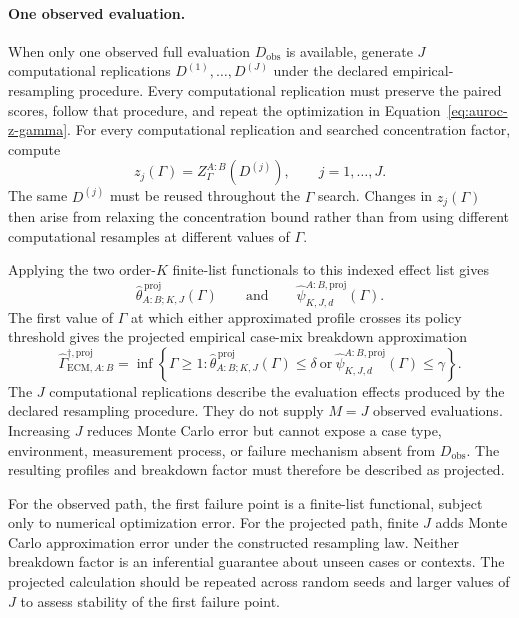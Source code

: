 \documentclass[11pt]{article}
\theoremstyle{remark}
\begin{document}
\paragraph{One observed evaluation.}
When only one observed full evaluation $D_{\mathrm{obs}}$ is available,
generate $J$ computational replications $D^{(1)},\ldots,D^{(J)}$ under the
declared empirical-resampling procedure. Every computational replication must preserve the paired scores,
follow that procedure, and repeat the optimization in
Equation~\eqref{eq:auroc-z-gamma}. For every computational replication and
searched concentration factor, compute
\[
z_j(\Gamma)
=
Z_\Gamma^{A:B}\!\left(D^{(j)}\right),
\qquad j=1,\ldots,J.
\]
The same $D^{(j)}$ must be reused throughout the $\Gamma$ search. Changes in
$z_j(\Gamma)$ then arise from relaxing the concentration bound rather than from
using different computational resamples at different values of $\Gamma$.

Applying the two order-$K$ finite-list functionals to this indexed effect list
gives
\[
\widehat\theta_{A:B;K,J}^{\,\mathrm{proj}}(\Gamma)
\qquad\text{and}\qquad
\widehat\psi_{K,J,d}^{A:B,\mathrm{proj}}(\Gamma).
\]
The first value of $\Gamma$ at which either approximated profile crosses its policy
threshold gives the projected empirical case-mix breakdown approximation
\begin{equation}
\widehat\Gamma_{\mathrm{ECM},A:B}^{\dagger,\mathrm{proj}}
=
\inf\left\{
\Gamma\geq1:
\widehat\theta_{A:B;K,J}^{\,\mathrm{proj}}(\Gamma)\leq\delta
\ \text{or}\ 
\widehat\psi_{K,J,d}^{A:B,\mathrm{proj}}(\Gamma)\leq\gamma
\right\}.
\label{eq:auroc-ecm-breakdown-projected}
\end{equation}
The $J$ computational replications describe the evaluation effects produced by
the declared resampling procedure. They do not supply $M=J$ observed
evaluations. Increasing $J$ reduces Monte Carlo error but cannot expose a case
type, environment, measurement process, or failure mechanism absent from
$D_{\mathrm{obs}}$. The resulting profiles and breakdown factor must therefore
be described as projected.

For the observed path, the first failure point is a finite-list functional,
subject only to numerical optimization error. For the projected path, finite
$J$ adds Monte Carlo approximation error under the constructed resampling law.
Neither breakdown factor is an inferential guarantee about unseen cases or
contexts. The projected calculation should be repeated across random seeds and
larger values of $J$ to assess stability of the first failure point.
\end{document}
